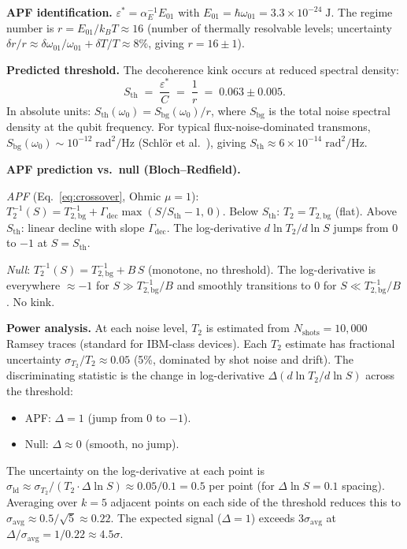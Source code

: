 \documentclass[11pt]{article}
\theoremstyle{remark}
\begin{document}
\smallskip\noindent\textbf{APF identification.}  $\varepsilon^* = \alpha_E^{-1} E_{01}$ with $E_{01} = \hbar\omega_{01} = 3.3 \times 10^{-24}\;\mathrm{J}$.  The regime number is $r = E_{01}/k_B T \approx 16$ (number of thermally resolvable levels; uncertainty $\delta r/r \approx \delta\omega_{01}/\omega_{01} + \delta T/T \approx 8\%$, giving $r = 16 \pm 1$).

\smallskip\noindent\textbf{Predicted threshold.}  The decoherence kink occurs at reduced spectral density:
\[
S_{\mathrm{th}} \;=\; \frac{\varepsilon^*}{C} \;=\; \frac{1}{r} \;=\; 0.063 \pm 0.005.
\]
In absolute units: $S_{\mathrm{th}}(\omega_0) = S_{\mathrm{bg}}(\omega_0)/r$, where $S_{\mathrm{bg}}$ is the total noise spectral density at the qubit frequency.  For typical flux-noise-dominated transmons, $S_{\mathrm{bg}}(\omega_0) \sim 10^{-12}\;\mathrm{rad}^2/\mathrm{Hz}$ (Schlör et al.~\cite{Schlor2019}), giving $S_{\mathrm{th}} \approx 6 \times 10^{-14}\;\mathrm{rad}^2/\mathrm{Hz}$.

\smallskip\noindent\textbf{APF prediction vs.\ null (Bloch--Redfield).}

\emph{APF} (Eq.~\eqref{eq:crossover}, Ohmic $\mu = 1$): $T_2^{-1}(S) = T_{2,\mathrm{bg}}^{-1} + \Gamma_{\mathrm{dec}} \max(S/S_{\mathrm{th}} - 1,\, 0)$.  Below $S_{\mathrm{th}}$: $T_2 = T_{2,\mathrm{bg}}$ (flat).  Above $S_{\mathrm{th}}$: linear decline with slope $\Gamma_{\mathrm{dec}}$.  The log-derivative $d\ln T_2/d\ln S$ jumps from $0$ to $-1$ at $S = S_{\mathrm{th}}$.

\emph{Null}: $T_2^{-1}(S) = T_{2,\mathrm{bg}}^{-1} + B\,S$ (monotone, no threshold).  The log-derivative is everywhere $\approx -1$ for $S \gg T_{2,\mathrm{bg}}^{-1}/B$ and smoothly transitions to $0$ for $S \ll T_{2,\mathrm{bg}}^{-1}/B$.  No kink.

\smallskip\noindent\textbf{Power analysis.}  At each noise level, $T_2$ is estimated from $N_{\mathrm{shots}} = 10{,}000$ Ramsey traces (standard for IBM-class devices).  Each $T_2$ estimate has fractional uncertainty $\sigma_{T_2}/T_2 \approx 0.05$ (5\%, dominated by shot noise and drift).  The discriminating statistic is the change in log-derivative $\Delta(d\ln T_2/d\ln S)$ across the threshold:
\begin{itemize}[nosep,leftmargin=2em]
\item APF: $\Delta = 1$ (jump from $0$ to $-1$).
\item Null: $\Delta \approx 0$ (smooth, no jump).
\end{itemize}
The uncertainty on the log-derivative at each point is $\sigma_{\mathrm{ld}} \approx \sigma_{T_2}/(T_2 \cdot \Delta\ln S) \approx 0.05/0.1 = 0.5$ per point (for $\Delta\ln S = 0.1$ spacing).  Averaging over $k = 5$ adjacent points on each side of the threshold reduces this to $\sigma_{\mathrm{avg}} \approx 0.5/\sqrt{5} \approx 0.22$.  The expected signal ($\Delta = 1$) exceeds $3\sigma_{\mathrm{avg}}$ at $\Delta/\sigma_{\mathrm{avg}} = 1/0.22 \approx 4.5\sigma$.
\end{document}
